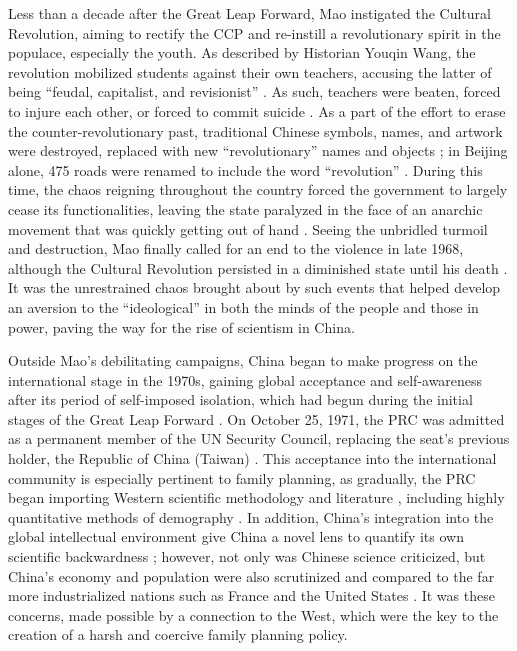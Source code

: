 \documentclass[12pt, a4paper, twoside]{article}
\begin{document}
Less than a decade after the Great Leap Forward, Mao instigated the Cultural Revolution, aiming to rectify the CCP and re-instill a revolutionary spirit in the populace, especially the youth. As described by Historian Youqin Wang, the revolution mobilized students against their own teachers, accusing the latter of being “feudal, capitalist, and revisionist” \autocite[pp.\ 6--32]{WangYouqin2001StudentAttacks}. As such, teachers were beaten, forced to injure each other, or forced to commit suicide \autocite[pp.\ 6--32]{WangYouqin2001StudentAttacks}. As a part of the effort to erase the counter-revolutionary past, traditional Chinese symbols, names, and artwork were destroyed, replaced with new “revolutionary” names and objects \autocite[pp.\ 61--62]{Lu2020RhetoricCulturalRevolution}; in Beijing alone, 475 roads were renamed to include the word “revolution” \autocite[p.\ 168]{Dutton1998}. During this time, the chaos reigning throughout the country forced the government to largely cease its functionalities, leaving the state paralyzed in the face of an anarchic movement that was quickly getting out of hand \autocite{Greenhalgh2008JustOneChild}. Seeing the unbridled turmoil and destruction, Mao finally called for an end to the violence in late 1968, although the Cultural Revolution persisted in a diminished state until his death \autocite{Phillips2016GuardianCulturalRevolution}. It was the unrestrained chaos brought about by such events that helped develop an aversion to the “ideological” in both the minds of the people and those in power, paving the way for the rise of scientism in China.

Outside Mao’s debilitating campaigns, China began to make progress on the international stage in the 1970s, gaining global acceptance and self-awareness after its period of self-imposed isolation, which had begun during the initial stages of the Great Leap Forward \autocite{Dreyer2007ChineseForeignPolicy}. On October 25, 1971, the PRC was admitted as a permanent member of the UN Security Council, replacing the seat’s previous holder, the Republic of China (Taiwan) \autocite{AIT2010UNRes2758}. This acceptance into the international community is especially pertinent to family planning, as gradually, the PRC began importing Western scientific methodology and literature \autocite[pp.\ 74--82]{Minami2024PeoplesDiplomacy}, including highly quantitative methods of demography \autocite[pp.\ 132--134]{Greenhalgh2008JustOneChild}. In addition, China’s integration into the global intellectual environment give China a novel lens to quantify its own scientific backwardness \autocite[p.\ 85]{Greenhalgh2008JustOneChild}; however, not only was Chinese science criticized, but China’s economy and population were also scrutinized and compared to the far more industrialized nations such as France and the United States \autocite[pp.\ 111-113, 118--120]{Greenhalgh2008JustOneChild}. It was these concerns, made possible by a connection to the West, which were the key to the creation of a harsh and coercive family planning policy.
\end{document}
